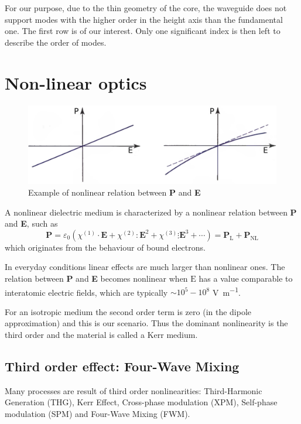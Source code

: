 \documentclass[12pt,a4paper,twoside]{article}
\begin{document}
For our purpose, due to the thin geometry of the core, the waveguide does not support modes with the higher order in the height axis than the fundamental one.
The first row is of our interest.
Only one significant index is then left to describe the order of modes.

\section{Non-linear optics}

\begin{figure}[!ht]
	\centering
	\includegraphics[width=.75\textwidth]{nonlinearity.png}
	\caption{Example of nonlinear relation between \textbf{P} and \textbf{E}}
	\label{fig_nonlinearity}
\end{figure}

A nonlinear dielectric medium is characterized by a nonlinear relation between \textbf{P} and \textbf{E}, such as
\begin{equation}
	\textbf{P} = \varepsilon_0 \left( \chi^{(1)} \cdot \textbf{E} + \chi^{(2)} : \textbf{E}^2 + \chi^{(3)} \vdots \textbf{E}^3 + \cdots \right) = \mathrm{\textbf{P}_L} + \mathrm{\textbf{P}_{NL}}
	\label{eq_P_general}
\end{equation}
which originates from the behaviour of bound electrons.

In everyday conditions linear effects are much larger than nonlinear ones.
The relation between \textbf{P} and \textbf{E} becomes nonlinear when $\mathrm{E}$ has a value comparable to interatomic electric fields, which are typically $\sim 10^5-10^8$ \si{\V\per\m}.

For an isotropic medium the second order term is zero (in the dipole approximation) and this is our scenario.
Thus the dominant nonlinearity is the third order and the material is called a Kerr medium.

\subsection{Third order effect: Four-Wave Mixing}
Many processes are result of third order nonlinearities: Third-Harmonic Generation (THG), Kerr Effect, Cross-phase modulation (XPM), Self-phase modulation (SPM) and Four-Wave Mixing (FWM).
\end{document}
